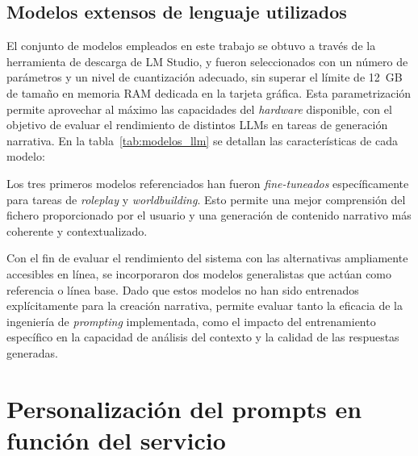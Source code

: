\subsection{Modelos extensos de lenguaje utilizados}\label{subsec:modelos-llm}
El conjunto de modelos empleados en este trabajo se obtuvo a través de la herramienta de descarga de LM Studio,
y fueron seleccionados con un número de parámetros y un nivel de cuantización adecuado,
sin superar el límite de 12~GB de tamaño en memoria RAM dedicada en la tarjeta gráfica.
Esta parametrización permite aprovechar al máximo las capacidades del \textit{hardware} disponible,
con el objetivo de evaluar el rendimiento de distintos LLMs en tareas de generación narrativa.
En la tabla~\ref{tab:modelos_llm} se detallan las características de cada modelo:

\begin{table}[h]
\centering
\caption{Modelos extensos de lenguaje utilizados en el estudio.}
\label{tab:modelos_llm}
\end{table}

Los tres primeros modelos referenciados han fueron \textit{fine-tuneados} específicamente para tareas de \textit{roleplay} y \textit{worldbuilding}.
Esto permite una mejor comprensión del fichero proporcionado por el usuario y una generación de contenido narrativo más coherente y contextualizado.

Con el fin de evaluar el rendimiento del sistema con las alternativas ampliamente accesibles en línea,
se incorporaron dos modelos generalistas que actúan como referencia o línea base.
Dado que estos modelos no han sido entrenados explícitamente para la creación narrativa,
permite evaluar tanto la eficacia de la ingeniería de \textit{prompting} implementada,
como el impacto del entrenamiento específico en la capacidad de análisis del contexto y la calidad de las respuestas generadas.

\section{Personalización del prompts en función del servicio}
